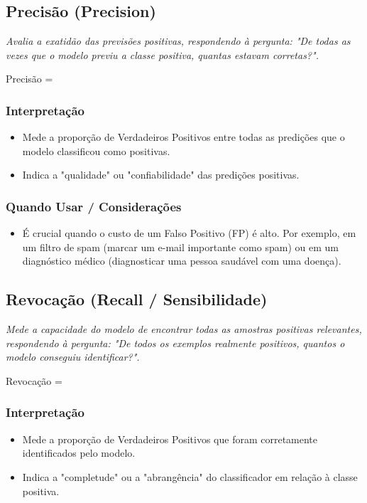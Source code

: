 \subsection{Precisão (Precision)}

\textit{Avalia a exatidão das previsões positivas, respondendo à pergunta: "De todas as vezes que o modelo previu a classe positiva, quantas estavam corretas?".}

\begin{equacaodestaque}{Precisão}
     = 
\end{equacaodestaque}

\subsubsection*{Interpretação}
\begin{itemize}
    \item Mede a proporção de Verdadeiros Positivos entre todas as predições que o modelo classificou como positivas.
    \item Indica a "qualidade" ou "confiabilidade" das predições positivas.
\end{itemize}

\subsubsection*{Quando Usar / Considerações}
\begin{itemize}
    \item É crucial quando o custo de um Falso Positivo (FP) é alto. Por exemplo, em um filtro de spam (marcar um e-mail importante como spam) ou em um diagnóstico médico (diagnosticar uma pessoa saudável com uma doença).
\end{itemize}

\subsection{Revocação (Recall / Sensibilidade)}

\textit{Mede a capacidade do modelo de encontrar todas as amostras positivas relevantes, respondendo à pergunta: "De todos os exemplos realmente positivos, quantos o modelo conseguiu identificar?".}

\begin{equacaodestaque}{Revocação}
     = 
\end{equacaodestaque}

\subsubsection*{Interpretação}
\begin{itemize}
    \item Mede a proporção de Verdadeiros Positivos que foram corretamente identificados pelo modelo.
    \item Indica a "completude" ou a "abrangência" do classificador em relação à classe positiva.
\end{itemize}

